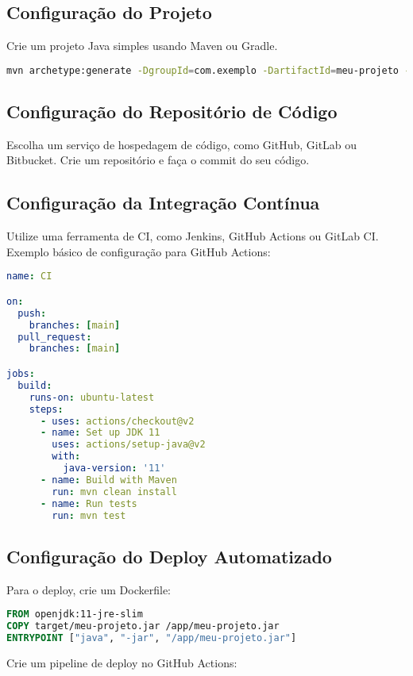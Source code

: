 \documentclass[a4paper,12pt]{book}
\begin{document}
\subsection{Configuração do Projeto}
Crie um projeto Java simples usando Maven ou Gradle.

\begin{lstlisting}[language=bash]
mvn archetype:generate -DgroupId=com.exemplo -DartifactId=meu-projeto -DarchetypeArtifactId=maven-archetype-quickstart -DinteractiveMode=false
\end{lstlisting}

\subsection{Configuração do Repositório de Código}
Escolha um serviço de hospedagem de código, como GitHub, GitLab ou Bitbucket. Crie um repositório e faça o commit do seu código.

\subsection{Configuração da Integração Contínua}
Utilize uma ferramenta de CI, como Jenkins, GitHub Actions ou GitLab CI. Exemplo básico de configuração para GitHub Actions:

\begin{lstlisting}[language=yaml]
name: CI

on:
  push:
    branches: [main]
  pull_request:
    branches: [main]

jobs:
  build:
    runs-on: ubuntu-latest
    steps:
      - uses: actions/checkout@v2
      - name: Set up JDK 11
        uses: actions/setup-java@v2
        with:
          java-version: '11'
      - name: Build with Maven
        run: mvn clean install
      - name: Run tests
        run: mvn test
\end{lstlisting}

\subsection{Configuração do Deploy Automatizado}
Para o deploy, crie um Dockerfile:

\begin{lstlisting}[language=Dockerfile]
FROM openjdk:11-jre-slim
COPY target/meu-projeto.jar /app/meu-projeto.jar
ENTRYPOINT ["java", "-jar", "/app/meu-projeto.jar"]
\end{lstlisting}

Crie um pipeline de deploy no GitHub Actions:
\end{document}
